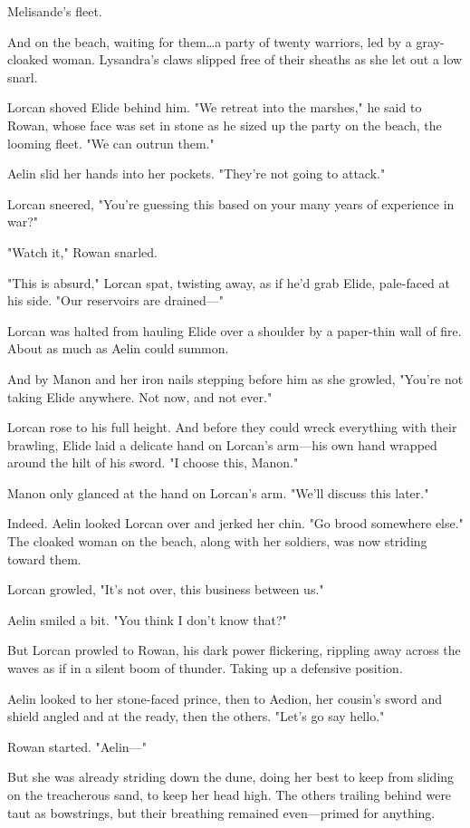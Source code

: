 Melisande's fleet.

And on the beach, waiting for them\ldots a party of twenty warriors, led by a gray-cloaked woman.
Lysandra's claws slipped free of their sheaths as she let out a low snarl.

Lorcan shoved Elide behind him.
"We retreat into the marshes," he said to Rowan, whose face was set in stone as he sized up the party on the beach, the looming fleet.
"We can outrun them."

Aelin slid her hands into her pockets.
"They're not going to attack."

Lorcan sneered, "You're guessing this based on your many years of experience in war?"

"Watch it," Rowan snarled.

"This is absurd," Lorcan spat, twisting away, as if he'd grab Elide, pale-faced at his side.
"Our reservoirs are drained---"

Lorcan was halted from hauling Elide over a shoulder by a paper-thin wall of fire.
About as much as Aelin could summon.

And by Manon and her iron nails stepping before him as she growled, "You're not taking Elide anywhere.
Not now, and not ever."

Lorcan rose to his full height.
And before they could wreck everything with their brawling, Elide laid a delicate hand on Lorcan's arm---his own hand wrapped around the hilt of his sword.
"I choose this, Manon."

Manon only glanced at the hand on Lorcan's arm.
"We'll discuss this later."

Indeed.
Aelin looked Lorcan over and jerked her chin.
"Go brood somewhere else."
The cloaked woman on the beach, along with her soldiers, was now striding toward them.

Lorcan growled, "It's not over, this business between us."

Aelin smiled a bit.
"You think I don't know that?"

But Lorcan prowled to Rowan, his dark power flickering, rippling away across the waves as if in a silent boom of thunder.
Taking up a defensive position.

Aelin looked to her stone-faced prince, then to Aedion, her cousin's sword and shield angled and at the ready, then the others.
"Let's go say hello."

Rowan started.
"Aelin---"

But she was already striding down the dune, doing her best to keep from sliding on the treacherous sand, to keep her head high.
The others trailing behind were taut as bowstrings, but their breathing remained even---primed for anything.

